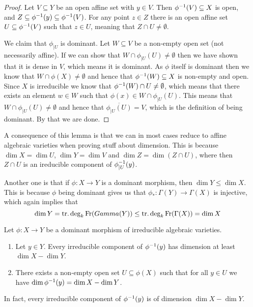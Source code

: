 \begin{proof}
Let $V\subseteq Y$ be an open affine set with $y\in V$. Then $\phi^{-1}(V)\subseteq X$ is open, and $Z\subseteq \phi^{-1}(y)\subseteq \phi^{-1}(V)$. For any point $z\in Z$ there is an open affine set $U\subseteq \phi^{-1}(V)$ such that $z\in U$, meaning that $Z\cap U \neq \emptyset$.

We claim that $\phi_{|U}$ is dominant. Let $W\subseteq V$ be a non-empty open set (not necessarily affine). If we can show that $W\cap \phi_{|U}(U)\neq \emptyset$ then we have shown that it is dense in $V$, which means it is dominant. As $\phi$ itself is dominant then we know that $W\cap \phi(X) \neq \emptyset$ and hence that $\phi^{-1}(W)\subseteq X$ is non-empty and open. Since $X$ is irreducible we know that $\phi^{-1}(W)\cap U\neq\emptyset$, which means that there exists an element $w\in W$ such that $\phi(x)\in W\cap \phi_{|U}(U)$. This means that $W\cap \phi_{|U}(U)\neq \emptyset$ and hence that $\overline{\phi_{|U}(U)} = V$, which is the definition of being dominant. By that we are done. 
\end{proof}

A consequence of this lemma is that we can in most cases reduce to affine algebraic varieties when proving stuff about dimension. This is because $\dim X = \dim U$, $\dim Y = \dim V$ and $\dim Z = \dim(Z\cap U)$, where then $Z\cap U$ is an ireducible component of $\phi_{|U}^{-1}(y)$. 

Another one is that if $\phi\colon X\longrightarrow Y$ is a dominant morphism, then $\dim Y\leq \dim X$. This is because $\phi$ being dominant gives us that $\phi_*\colon \Gamma(Y)\longrightarrow \Gamma(X)$ is injective, which again implies that 
\begin{equation*}
    \dim Y = \operatorname{tr.deg}_k \operatorname{Fr}(Gamma(Y)) \leq \operatorname{tr.deg}_k \operatorname{Fr}(\Gamma(X)) = \dim X
\end{equation*}


\begin{theorem}
Let $\phi\colon X\longrightarrow Y$ be a dominant morphism of irreducible algebraic varieties. 
\begin{enumerate}
    \item Let $y\in Y$. Every irreducible component of $\phi^{-1}(y)$ has dimension at least $\dim X - \dim Y$.
    \item There exists a non-empty open set $U\subseteq \phi(X)$ such that for all $y\in U$ we have $\dim\phi^{-1}(y) = \dim X - \dim Y$.
\end{enumerate}
In fact, every irreducible component of $\phi^{-1}(y)$ is of dimension $\dim X - \dim Y$.
\end{theorem}

